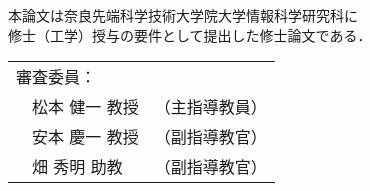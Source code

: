 \renewcommand\thepage{Title2}
\thispagestyle{empty}
\vspace*{8cm}
\begin{center}
本論文は奈良先端科学技術大学院大学情報科学研究科に$\ $ \\
修士（工学）授与の要件として提出した修士論文である．

 \bigskip

 \jauthor
 \vspace*{0.4cm}
 \begin{table}[h]
 \begin{center}
	\begin{tabular}[t]{p{}ll}
	 \multicolumn{2}{l}{審査委員：} \\
	 & 松本 健一 教授 & （主指導教員） \\
	 & 安本 慶一 教授 & （副指導教官） \\
	 & 畑 秀明 助教 & （副指導教官）
	\end{tabular}
 \end{center}
 \end{table}
 \end{center}